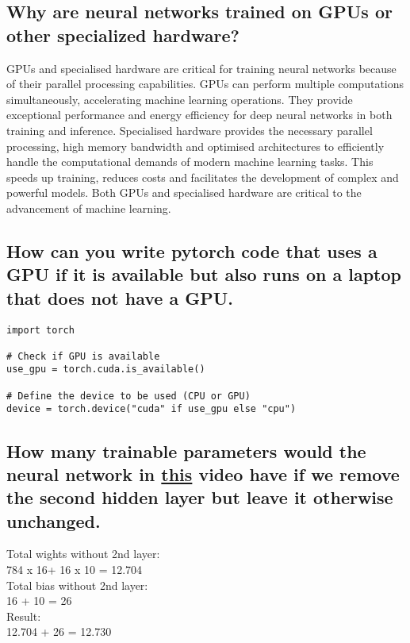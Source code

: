 \documentclass{article}
\begin{document}
\subsection{Why are neural networks trained on GPUs or other specialized hardware?}

GPUs and specialised hardware are critical for training neural networks because of their parallel processing capabilities.
GPUs can perform multiple computations simultaneously, accelerating machine learning operations.
They provide exceptional performance and energy efficiency for deep neural networks in both training and inference.
Specialised hardware provides the necessary parallel processing, high memory bandwidth and optimised architectures to efficiently handle the computational demands of modern machine learning tasks.
This speeds up training, reduces costs and facilitates the development of complex and powerful models.
Both GPUs and specialised hardware are critical to the advancement of machine learning.


\subsection{How can you write pytorch code that uses a GPU if it is available but also runs on a laptop that does not have a GPU.}

\begin{lstlisting}
import torch

# Check if GPU is available
use_gpu = torch.cuda.is_available()

# Define the device to be used (CPU or GPU)
device = torch.device("cuda" if use_gpu else "cpu")
\end{lstlisting}


\subsection{How many trainable parameters would the neural network in \href{https://www.youtube.com/watch?v=aircAruvnKk&t=1s&ab_channel=3Blue1Brown}{this} video have if we remove the second hidden layer but leave it otherwise unchanged.}

Total wights without 2nd layer:\\784 x 16+ 16 x 10 = 12.704 \\
Total bias without 2nd layer:\\16 + 10 = 26 \\
Result:\\
12.704 + 26 = 12.730
\end{document}
